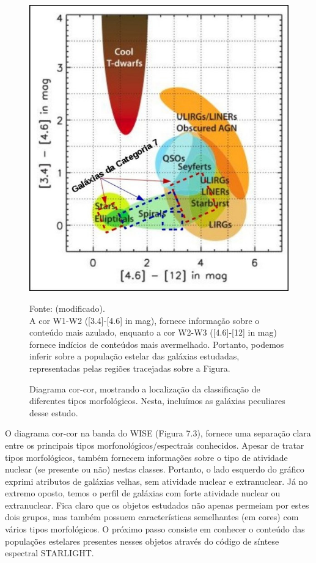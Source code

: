 \begin{figure}[H]
	\centering	
    \caption{Diagrama cor-cor, mostrando a localização da classificação de diferentes tipos morfológicos. Nesta, incluímos as galáxias peculiares desse estudo.}
    \includegraphics[width=1.0\textwidth]{figuras/coresm.jpg}
   	\begin{center}
        \normalsize Fonte: \cite{wright2010wide} (modificado).\\A cor W1-W2 ([3.4]-[4.6] in mag), fornece informação sobre o conteúdo mais azulado, enquanto a cor W2-W3 ([4.6]-[12] in mag) fornece indícios de conteúdos mais avermelhado. Portanto, podemos inferir sobre a população estelar das galáxias estudadas, representadas pelas regiões tracejadas sobre a Figura.
    \end{center}
	\label{fig:cores}
\end{figure}

O diagrama cor-cor na banda do WISE (Figura 7.3), fornece uma separação clara entre os principais tipos morfonológicos/espectrais conhecidos. Apesar de tratar tipos morfológicos, também fornecem informações sobre o tipo de atividade nuclear (se presente ou não) nestas classes. Portanto, o lado esquerdo do gráfico exprimi atributos de galáxias velhas, sem atividade nuclear e extranuclear. Já no extremo oposto, temos o perfil
de galáxias com forte atividade nuclear ou extranuclear. Fica claro que os objetos estudados não apenas permeiam por estes dois grupos, mas também possuem características semelhantes (em cores) com vários tipos morfológicos. O próximo passo consiste em conhecer o conteúdo das populações estelares presentes nesses objetos através do código de síntese espectral STARLIGHT.

